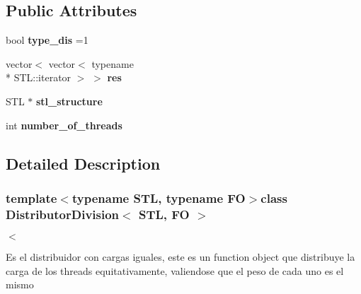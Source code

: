 \subsection*{Public Attributes}
\begin{DoxyCompactItemize}
\item 
\hypertarget{class_distributor_division_afa4ba8c8ee8752a7d9f4e1631d72c3ae}{bool {\bfseries type\-\_\-dis} =1}\label{class_distributor_division_afa4ba8c8ee8752a7d9f4e1631d72c3ae}

\item 
\hypertarget{class_distributor_division_aa3765b37f31212fd42652a182a683748}{vector$<$ vector$<$ typename \\*
S\-T\-L\-::iterator $>$ $>$ {\bfseries res}}\label{class_distributor_division_aa3765b37f31212fd42652a182a683748}

\item 
\hypertarget{class_distributor_division_a3eb8595ad7005f489af585b24b3bed4e}{S\-T\-L $\ast$ {\bfseries stl\-\_\-structure}}\label{class_distributor_division_a3eb8595ad7005f489af585b24b3bed4e}

\item 
\hypertarget{class_distributor_division_a2b9aebf1852cfcadf450ed0305bdb530}{int {\bfseries number\-\_\-of\-\_\-threads}}\label{class_distributor_division_a2b9aebf1852cfcadf450ed0305bdb530}

\end{DoxyCompactItemize}


\subsection{Detailed Description}
\subsubsection*{template$<$typename S\-T\-L, typename F\-O$>$class Distributor\-Division$<$ S\-T\-L, F\-O $>$}

$<$

Es el distribuidor con cargas iguales, este es un function object que distribuye la carga de los threads equitativamente, valiendose que el peso de cada uno es el mismo 

